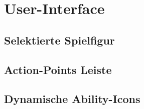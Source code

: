 \chapter{User-Interface}

\section{Selektierte Spielfigur}

\section{Action-Points Leiste}

\section{Dynamische Ability-Icons}